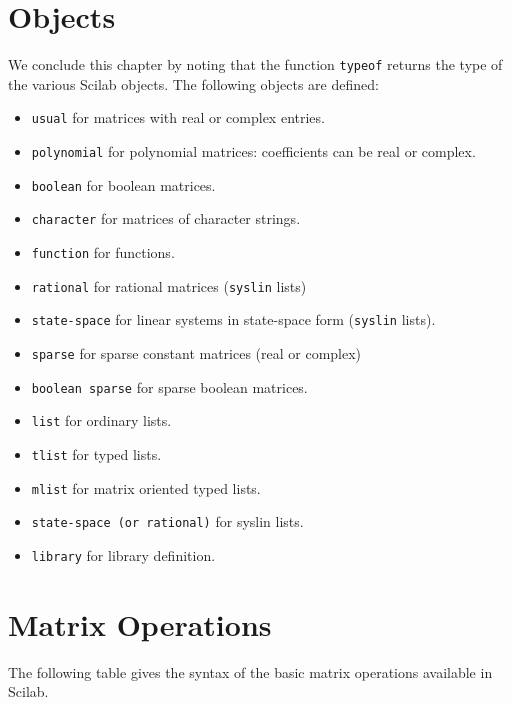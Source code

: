 \section{Objects}
We conclude this chapter by noting that the function {\tt typeof}
returns the type of the various Scilab objects. The following objects
are defined:
\begin{itemize}
\item{\tt usual} 	for matrices with real or complex entries.
\item{\tt polynomial} 	for polynomial matrices: coefficients can be 
real or complex.
\item{\tt boolean} 	for boolean matrices.
\item{\tt character} 	for matrices of character strings.
\item{\tt function} 	for functions.
\item{\tt rational} 	for rational matrices ({\tt syslin} lists)
\item{\tt state-space} 	for linear systems in state-space 
form ({\tt syslin} lists).
\item{\tt sparse} 	for sparse constant matrices (real or complex)
\item{\tt boolean sparse} for sparse boolean matrices.
\item{\tt list} 	for ordinary lists.
\item{\tt tlist}        for typed lists.
\item{\tt mlist}        for matrix oriented typed lists.
\item{\tt state-space (or rational)} for syslin lists.
\item{\tt library} 	for library definition.
\end{itemize}


\section{Matrix Operations}
The following table gives the syntax of the basic matrix operations
available in Scilab.

